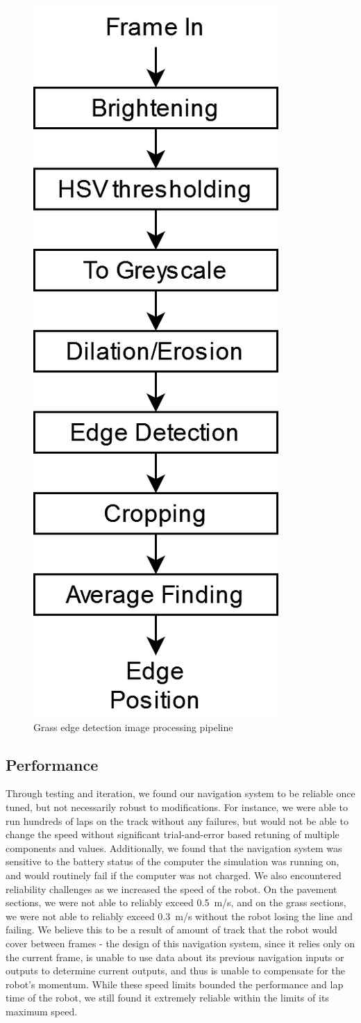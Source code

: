 \documentclass[titlepage, twocolumn]{article}
\begin{document}
            \begin{figure}
                \begin{center}
                    \includegraphics[width=0.3\linewidth]{grasspipeline.png}
                \end{center}
                \caption{Grass edge detection image processing pipeline}
                \label{fig:grasspipeline}
            \end{figure}

    \subsection{Performance}
        Through testing and iteration, we found our navigation system to be reliable once tuned, but not necessarily robust to modifications. For instance, we were able to run hundreds of laps on the track without any failures, but would not be able to change the speed without significant trial-and-error based retuning of multiple components and values. Additionally, we found that the navigation system was sensitive to the battery status of the computer the simulation was running on, and would routinely fail if the computer was not charged. We also encountered reliability challenges as we increased the speed of the robot. On the pavement sections, we were not able to reliably exceed 0.5~m/s, and on the grass sections, we were not able to reliably exceed 0.3~m/s without the robot losing the line and failing. We believe this to be a result of amount of track that the robot would cover between frames - the design of this navigation system, since it relies only on the current frame, is unable to use data about its previous navigation inputs or outputs to determine current outputs, and thus is unable to compensate for the robot's momentum. While these speed limits bounded the performance and lap time of the robot, we still found it extremely reliable within the limits of its maximum speed.
\end{document}

